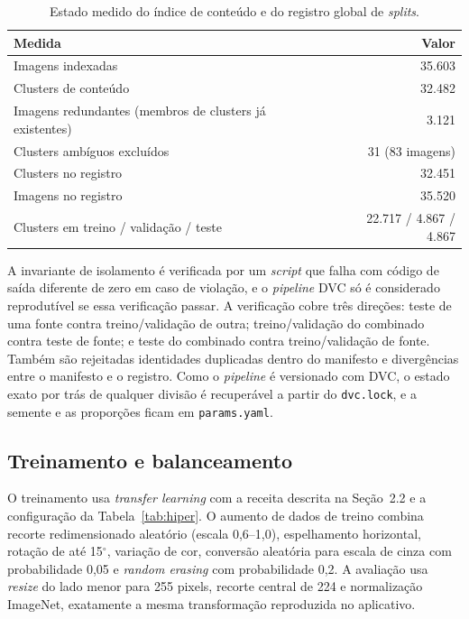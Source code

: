 \documentclass[11pt,a4paper]{article}
\begin{document}
	\begin{table}[htbp]
		\centering
		\small
		\caption{Estado medido do índice de conteúdo e do registro global de \textit{splits}.}
		\label{tab:indexacao}
		\begin{tabular}{lr}
			\toprule
			\textbf{Medida} & \textbf{Valor} \\
			\midrule
			Imagens indexadas & 35.603 \\
			Clusters de conteúdo & 32.482 \\
			Imagens redundantes (membros de clusters já existentes) & 3.121 \\
			Clusters ambíguos excluídos & 31 (83 imagens) \\
			Clusters no registro & 32.451 \\
			Imagens no registro & 35.520 \\
			Clusters em treino / validação / teste & 22.717 / 4.867 / 4.867 \\
			\bottomrule
		\end{tabular}
	\end{table}
	
	A invariante de isolamento é verificada por um \textit{script} que falha com código de saída diferente de zero em caso de violação, e o \textit{pipeline} DVC só é considerado reprodutível se essa verificação passar. A verificação cobre três direções: teste de uma fonte contra treino/validação de outra; treino/validação do combinado contra teste de fonte; e teste do combinado contra treino/validação de fonte. Também são rejeitadas identidades duplicadas dentro do manifesto e divergências entre o manifesto e o registro. Como o \textit{pipeline} é versionado com DVC, o estado exato por trás de qualquer divisão é recuperável a partir do \texttt{dvc.lock}, e a semente e as proporções ficam em \texttt{params.yaml}.
	
	\subsection{Treinamento e balanceamento}
	
	O treinamento usa \emph{transfer learning} com a receita descrita na Seção~2.2 e a configuração da Tabela~\ref{tab:hiper}. O aumento de dados de treino combina recorte redimensionado aleatório (escala 0,6--1,0), espelhamento horizontal, rotação de até 15$^\circ$, variação de cor, conversão aleatória para escala de cinza com probabilidade 0,05 e \emph{random erasing} com probabilidade 0,2. A avaliação usa \emph{resize} do lado menor para 255 pixels, recorte central de 224 e normalização ImageNet, exatamente a mesma transformação reproduzida no aplicativo.
	
\end{document}
